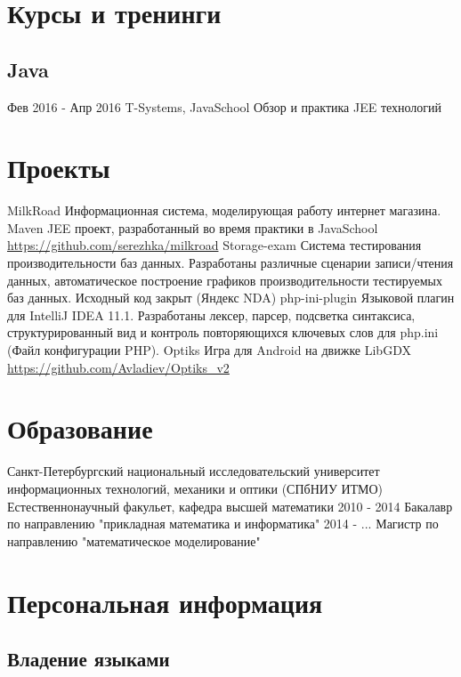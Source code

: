 \documentclass[11pt,a4paper,russian]{moderncv}
\begin{document}
\section{Курсы и тренинги}
\subsection{Java}
\cvline
  {Фев 2016 - Апр 2016}
  {T-Systems, JavaSchool \newline{}
  Обзор и практика JEE технологий} 
  
\newpage  

\section{Проекты}
\cvline
  {MilkRoad}
  {Информационная система, моделирующая работу интернет магазина. Maven JEE проект, разработанный во время практики в JavaSchool \newline{}
  \url{https://github.com/serezhka/milkroad}}
\cvline
  {Storage-exam}
  {Система тестирования производительности баз данных.\newline{} 
  Разработаны различные сценарии записи/чтения данных, автоматическое построение графиков производительности тестируемых баз данных.\newline{} Исходный код закрыт (Яндекс NDA)}
\cvline
  {php-ini-plugin}
  {Языковой плагин для IntelliJ IDEA 11.1. \newline{} 
  Разработаны лексер, парсер, подсветка синтаксиса, структурированный вид и контроль повторяющихся ключевых слов для php.ini (Файл конфигурации PHP).}  
\cvline
  {Optiks}
  {Игра для Android на движке LibGDX \newline{}
  \url{https://github.com/Avladiev/Optiks_v2}}
  
\section{Образование}
  \cventry
    {}
    {\textnormal{Санкт-Петербургский национальный исследовательский университет информационных технологий, механики и оптики}{ (СПбНИУ ИТМО)}}
    {\textnormal{Естественнонаучный факульет, кафедра высшей математики}}
    {}{}{}
  \cventry
    {2010 - 2014}
    {\textnormal{Бакалавр по направлению "прикладная математика и информатика"}}
    {}{}{}{}
  \cventry
    {2014 - ...}
    {\textnormal{Магистр по направлению "математическое моделирование"}}
    {}{}{}{}

\section{Персональная информация}
\subsection{Владение языками}
\end{document}
